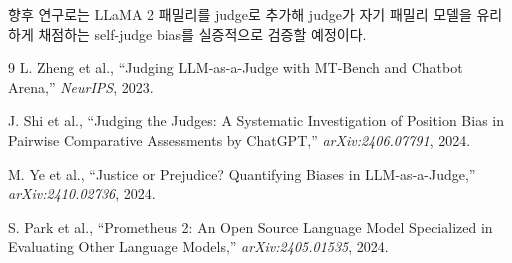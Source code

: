 \documentclass{kcc}
\begin{document}
향후 연구로는 LLaMA 2 패밀리를 judge로 추가해 judge가 자기 패밀리 모델을
유리하게 채점하는 self-judge bias를 실증적으로 검증할 예정이다.

\begin{thebibliography}{9}
L. Zheng et al., ``Judging LLM-as-a-Judge with MT-Bench and Chatbot Arena,''
\textit{NeurIPS}, 2023.

J. Shi et al., ``Judging the Judges: A Systematic Investigation of Position Bias
in Pairwise Comparative Assessments by ChatGPT,''
\textit{arXiv:2406.07791}, 2024.

M. Ye et al., ``Justice or Prejudice? Quantifying Biases in LLM-as-a-Judge,''
\textit{arXiv:2410.02736}, 2024.

S. Park et al., ``Prometheus 2: An Open Source Language Model Specialized in
Evaluating Other Language Models,''
\textit{arXiv:2405.01535}, 2024.
\end{thebibliography}
\end{document}
